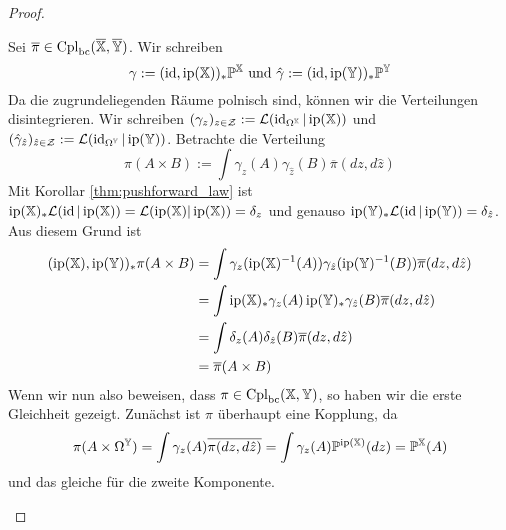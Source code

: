 \begin{proof}
\begin{enumerate}
Sei $\overline{\pi} \in \operatorname{Cpl}_{\operatorname{bc}}(\overline{\mathbb{X}}, \overline{\mathbb{Y}})$. Wir schreiben
$$\gamma := (\operatorname{id}, \operatorname{ip}(\mathbb{X}))_*\mathbb{P}^\mathbb{X} \text{ und } \hat{\gamma}:=(\operatorname{id}, \operatorname{ip}(\mathbb{Y}))_*\mathbb{P}^\mathbb{Y}$$
Da die zugrundeliegenden Räume polnisch sind, können wir die Verteilungen disintegrieren. Wir schreiben $(\gamma_z)_{z \in \mathcal{Z}}:=\mathcal{L}(\operatorname{id}_{\Omega^\mathbb{X}} \vert \operatorname{ip}(\mathbb{X}))$ und $(\hat{\gamma}_{\hat{z}})_{\hat{z} \in \mathcal{Z}}:=\mathcal{L}(\operatorname{id}_{\Omega^\mathbb{Y}} \vert \operatorname{ip}(\mathbb{Y}))$.
Betrachte die Verteilung 
$$\pi(A\times B) := \int \gamma_z(A) \gamma_{\hat{z}}(B)\overline{\pi}(dz, d\hat{z})$$
Mit Korollar \ref{thm:pushforward_law} ist $\operatorname{ip}(\mathbb{X})_*\mathcal{L}(\operatorname{id} \vert \operatorname{ip}(\mathbb{X}))= \mathcal{L}(\operatorname{ip}(\mathbb{X}) \vert \operatorname{ip}(\mathbb{X}))= \delta_{z}$ und genauso $\operatorname{ip}(\mathbb{Y})_*\mathcal{L}(\operatorname{id} \vert \operatorname{ip}(\mathbb{Y})) = \delta_{\hat{z}}$. Aus diesem Grund ist
\begin{align*}
(\operatorname{ip}(\mathbb{X}), \operatorname{ip}(\mathbb{Y}))_*\pi(A \times B) &= \int \gamma_z(\operatorname{ip}(\mathbb{X})^{-1}(A)) \gamma_{\hat{z}}(\operatorname{ip}(\mathbb{Y})^{-1}(B))\overline{\pi}(dz, d\hat{z}) \\
&= \int \operatorname{ip}(\mathbb{X})_*\gamma_z(A) \operatorname{ip}(\mathbb{Y})_*\gamma_{\hat{z}}(B) \overline{\pi}(dz, d\hat{z}) \\
&= \int \delta_z(A) \delta_{\hat{z}}(B)\overline{\pi}(dz, d\hat{z}) \\
&= \overline{\pi}(A \times B)
\end{align*}
Wenn wir nun also beweisen, dass $\pi \in \operatorname{Cpl}_{\operatorname{bc}}(\mathbb{X}, \mathbb{Y})$, so haben wir die erste Gleichheit gezeigt. Zunächst ist $\pi$ überhaupt eine Kopplung,  da 
$$\pi(A\times \Omega^{\mathbb{Y}}) = \int \gamma_z(A) \overline{\pi(dz, d\hat{z})} = \int \gamma_z(A) \mathbb{P}^{\operatorname{ip}(\mathbb{X})}(dz) = \mathbb{P}^\mathbb{X}(A)$$
und das gleiche für die zweite Komponente.


\end{enumerate}
\end{proof}

